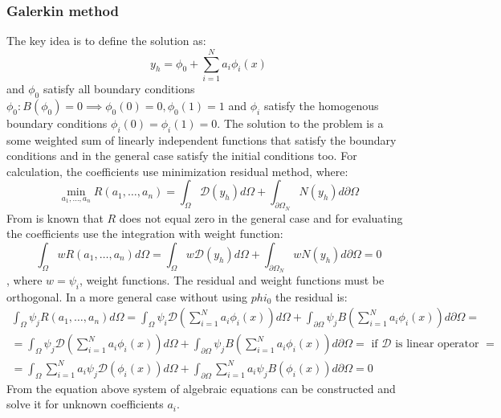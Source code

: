 \subsubsection{Galerkin method}
The key idea is to define the solution as:
\begin{equation*}
	y_h = \phi_0 + \sum_{i = 1}^N a_i \phi_i(x)
\end{equation*}
and $\phi_0$ satisfy all boundary conditions $\phi_0: B(\phi_0) = 0 \implies \phi_0(0) = 0, \phi_0(1) = 1$ and $\phi_i$ satisfy the homogenous boundary conditions $\phi_i(0) = \phi_i(1) = 0$. The solution to the problem is a some weighted sum of linearly independent functions that satisfy the boundary conditions and in the general case satisfy the initial conditions too. For calculation, the coefficients use minimization residual method, where:
\begin{equation*}
	\min_{a_1, \dots, a_n} R(a_1, \dots, a_n) = \int_{\Omega} \mathcal{D}(y_h) d\Omega + \int_{\partial \Omega_N} N(y_h) d\partial \Omega
\end{equation*}
From \cite{fletcher2012computational} is known that $R$ does not equal zero in the general case and for evaluating the coefficients use the integration with weight function:
\begin{equation*}
	\int_{\Omega} w R(a_1, \dots, a_n) d\Omega = \int_{\Omega} w \mathcal{D}(y_h) d\Omega + \int_{\partial \Omega_N} w N(y_h) d\partial \Omega = 0
\end{equation*}
, where $w = \psi_i$, weight functions. The residual and weight functions must be orthogonal.
In a more general case without using $phi_0$ the residual is:
\begin{equation*} 
	\begin{multlined}
		\int_{\Omega} \psi_j R(a_1, \dots, a_n) d\Omega = \int_{\Omega} \psi_i \mathcal{D}(\sum_{i = 1}^N a_i \phi_i(x)) d\Omega + \int_{\partial \Omega} \psi_j B(\sum_{i = 1}^N a_i \phi_i(x)) d\partial \Omega = \\ =
		\int_{\Omega} \psi_j \mathcal{D}(\sum_{i = 1}^N a_i \phi_i(x)) d\Omega + \int_{\partial \Omega} \psi_j B(\sum_{i = 1}^N a_i \phi_i(x)) d\partial \Omega = \text{ if $\mathcal{D}$ is linear operator } = \\ = \int_{\Omega} \sum_{i = 1}^N  a_i \psi_j \mathcal{D}(\phi_i(x)) d\Omega + \int_{\partial \Omega} \sum_{i = 1}^N  a_i \psi_j B(\phi_i(x)) d\partial \Omega = 0
	\end{multlined}
\end{equation*}
From the equation above system of algebraic equations can be constructed and solve it for unknown coefficients $a_i$.
